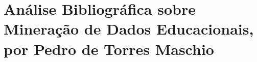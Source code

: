 \chapter{Análise Bibliográfica sobre Mineração de Dados Educacionais, por Pedro de Torres Maschio\label{chap:bibliometria:pedro-maschio}}


